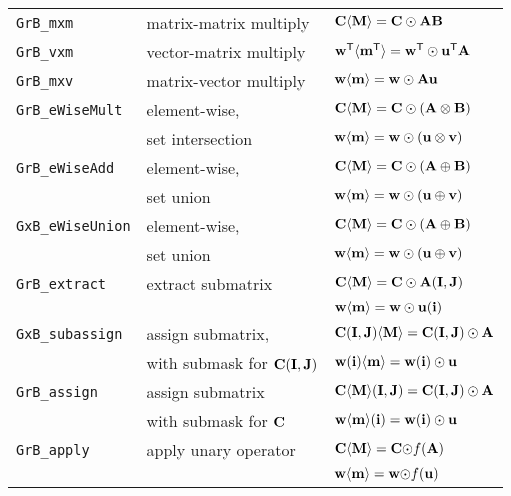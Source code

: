 \documentclass[12pt]{article}
\begin{document}
{\vspace{0.2in}
{\small
\begin{tabular}{lll}
\hline
\verb'GrB_mxm'       & matrix-matrix multiply  & ${\bf C \langle M \rangle = C \odot AB}$ \\
\verb'GrB_vxm'       & vector-matrix multiply  & ${\bf w^{\sf T}\langle m^{\sf T}\rangle = w^{\sf T}\odot u^{\sf T}A}$ \\
\verb'GrB_mxv'       & matrix-vector multiply  & ${\bf w \langle m \rangle = w \odot Au}$ \\
\hline
\verb'GrB_eWiseMult' & element-wise,           & ${\bf C \langle M \rangle = C \odot (A \otimes B)}$ \\
                     & set intersection        & ${\bf w \langle m \rangle = w \odot (u \otimes v)}$ \\
\hline
\verb'GrB_eWiseAdd'  & element-wise,           & ${\bf C \langle M \rangle = C \odot (A \oplus  B)}$ \\
                     & set union               & ${\bf w \langle m \rangle = w \odot (u \oplus  v)}$ \\
\hline
\verb'GxB_eWiseUnion'& element-wise,           & ${\bf C \langle M \rangle = C \odot (A \oplus  B)}$ \\
                     & set union               & ${\bf w \langle m \rangle = w \odot (u \oplus  v)}$ \\
\hline
\verb'GrB_extract'   & extract submatrix       & ${\bf C \langle M \rangle = C \odot A(I,J)}$ \\
                     &                         & ${\bf w \langle m \rangle = w \odot u(i)}$ \\
\hline
\verb'GxB_subassign' & assign submatrix,       & ${\bf C (I,J) \langle M \rangle = C(I,J) \odot A}$ \\
                     & with submask for ${\bf C(I,J)}$
                                               & ${\bf w (i)   \langle m \rangle = w(i)   \odot u}$ \\
\hline
\verb'GrB_assign'    & assign submatrix        & ${\bf C \langle M \rangle (I,J) = C(I,J) \odot A}$ \\
                     & with submask for ${\bf C}$
                                               & ${\bf w \langle m \rangle (i)   = w(i)   \odot u}$ \\
\hline
\verb'GrB_apply'     & apply unary operator    & ${\bf C \langle M \rangle = C \odot} f{\bf (A)}$ \\
                     &                         & ${\bf w \langle m \rangle = w \odot} f{\bf (u)}$ \\

\end{tabular}}}
\end{document}

